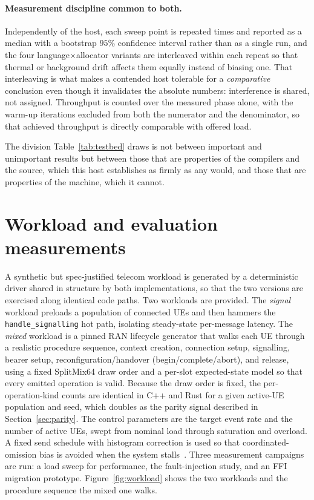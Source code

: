 \documentclass[english,twoside,openright,a4paper,censored,csm,software-track-2020]{HYthesisML}
\begin{document}
\paragraph{Measurement discipline common to both.}
Independently of the host, each sweep point is repeated \NRepeats{} times and reported as a
median with a bootstrap $95\%$ confidence interval rather than as a single run, and the four
language$\times$allocator variants are interleaved within each repeat so that thermal or
background drift affects them equally instead of biasing one. That interleaving is what makes
a contended host tolerable for a \emph{comparative} conclusion even though it invalidates the
absolute numbers: interference is shared, not assigned. Throughput is counted over the measured
phase alone, with the warm-up iterations excluded from both the numerator and the denominator,
so that achieved throughput is directly comparable with offered load.

The division Table~\ref{tab:testbed} draws is not between important and unimportant results but
between those that are properties of the compilers and the source, which this host establishes as
firmly as any would, and those that are properties of the machine, which it cannot.

\section{Workload and evaluation measurements\label{sec:workload}}
A synthetic but spec-justified telecom workload is generated by a deterministic driver shared
in structure by both implementations, so that the two versions are exercised along identical
code paths. Two workloads are provided. The \emph{signal} workload preloads a population of
connected UEs and then hammers the \texttt{handle\_signalling} hot path, isolating steady-state
per-message latency. The \emph{mixed} workload is a pinned RAN lifecycle generator that walks
each UE through a realistic procedure sequence, context creation, connection setup, signalling,
bearer setup, reconfiguration/handover (begin/complete/abort), and release, using a fixed
SplitMix64 draw order and a per-slot expected-state model so that every emitted operation is
valid. Because the draw order is fixed, the per-operation-kind counts are identical in C++ and
Rust for a given active-UE population and seed, which doubles as the parity signal described in
Section~\ref{sec:parity}. The control parameters are the target event rate and the number of
active UEs, swept from nominal load through saturation and overload. A fixed send schedule with
histogram correction is used so that coordinated-omission bias is avoided when the system
stalls~\cite{schroeder2006openclosed,tene_hdrhistogram}. Three measurement campaigns are run: a load sweep for
performance, the fault-injection study, and an FFI migration prototype.
Figure~\ref{fig:workload} shows the two workloads and the procedure sequence the mixed one
walks.
\end{document}
